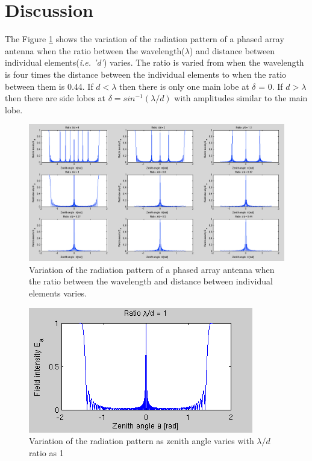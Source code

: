 \documentclass{article}
\begin{document}

\section{Discussion}

The Figure \ref{fig:ratio} shows the variation of the radiation pattern of a phased array antenna when the ratio between the wavelength($\lambda$) and distance between individual elements(\textit{i.e. 'd'}) varies. The ratio is varied from when the wavelength is four times the distance between the individual elements to when the ratio between them is 0.44. If $d<\lambda$ then there is only one main lobe at $\delta $ = 0. If $d>\lambda $ then there are side lobes at $\delta = sin^{-1}(\lambda/d)$ with amplitudes similar to the main lobe. 

\begin{figure}[tbh]
\centering
\includegraphics[width=\textwidth]{Figures/ratio.png}
\caption{Variation of the radiation pattern of a phased array antenna when the ratio between the wavelength and distance between individual elements varies.}
\label{fig:ratio}
\end{figure}

\begin{figure}[tbh]
\centering
\includegraphics[scale=0.8]{Figures/ratio_1.png}
\caption{Variation of the radiation pattern as zenith angle varies with $\lambda/d$ ratio as 1}
\label{fig:ratio_1}
\end{figure}
\end{document}
